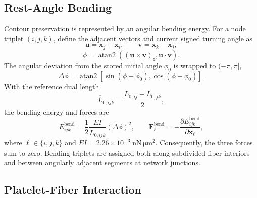 \documentclass[twocolumn, 10pt]{article}
\begin{document}
\subsection{Rest-Angle Bending}
Contour preservation is represented by an angular bending energy. For a node triplet $(i,j,k)$, define the adjacent vectors and current signed turning angle as
\begin{equation}
\mathbf u=\mathbf x_j-\mathbf x_i,\qquad
\mathbf v=\mathbf x_k-\mathbf x_j,
\end{equation}
\begin{equation}
\phi=\operatorname{atan2}\!\left(
(\mathbf u\times\mathbf v)_z,\mathbf u\cdot\mathbf v\right).
\end{equation}
The angular deviation from the stored initial angle $\phi_0$ is wrapped to $(-\pi,\pi]$,
\begin{equation}
\Delta\phi=\operatorname{atan2}\!\left[
\sin(\phi-\phi_0),\cos(\phi-\phi_0)\right].
\end{equation}
With the reference dual length
\begin{equation}
\overline L_{0,ijk}=\frac{L_{0,ij}+L_{0,jk}}{2},
\end{equation}
the bending energy and forces are
\begin{equation}
E_{ijk}^{\mathrm{bend}}=
\frac{1}{2}\frac{EI}{\overline L_{0,ijk}}(\Delta\phi)^2,
\qquad
\mathbf F_{\ell}^{\mathrm{bend}}
=-\frac{\partial E_{ijk}^{\mathrm{bend}}}{\partial\mathbf x_\ell},
\label{eq:bending-energy}
\end{equation}
where $\ell\in\{i,j,k\}$ and $EI=2.26\times10^{-3}\;\mathrm{nN\,\mu m^2}$. Consequently, the three forces sum to zero. Bending triplets are assigned both along subdivided fiber interiors and between angularly adjacent segments at network junctions.
\subsection{Platelet-Fiber Interaction}
\end{document}
